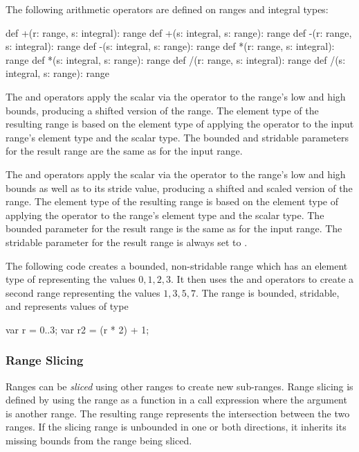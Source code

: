 The following arithmetic operators are defined on ranges and integral
types:

\begin{chapel}
def +(r: range, s: integral): range
def +(s: integral, s: range): range
def -(r: range, s: integral): range
def -(s: integral, s: range): range
def *(r: range, s: integral): range
def *(s: integral, s: range): range
def /(r: range, s: integral): range
def /(s: integral, s: range): range
\end{chapel}

The \chpl{+} and \chpl{-} operators apply the scalar via the operator
to the range's low and high bounds, producing a shifted version of the
range.  The element type of the resulting range is based on the
element type of applying the operator to the input range's element
type and the scalar type.  The bounded and stridable parameters for
the result range are the same as for the input range.

The \chpl{*} and \chpl{/} operators apply the scalar via the operator
to the range's low and high bounds as well as to its stride value,
producing a shifted and scaled version of the range.  The element type
of the resulting range is based on the element type of applying the
operator to the range's element type and the scalar type.  The bounded
parameter for the result range is the same as for the input range.
The stridable parameter for the result range is always set to
.

\begin{example}
The following code creates a bounded, non-stridable range 
which has an element type of  representing the values ${0,
  1, 2, 3}$.  It then uses the \chpl{*} and \chpl{+} operators to
create a second range  representing the values ${1, 3, 5,
  7}$.  The  range is bounded, stridable, and represents
values of type 
\begin{chapel}
var r = 0..3;
var r2 = (r * 2) + 1;
\end{chapel}
\end{example}


\subsubsection{Range Slicing}
\label{Range_Slicing}

Ranges can be \emph{sliced} using other ranges to create new
sub-ranges.  Range slicing is defined by using the range as a function
in a call expression where the argument is another range.  The
resulting range represents the intersection between the two ranges.
If the slicing range is unbounded in one or both directions, it
inherits its missing bounds from the range being sliced.

